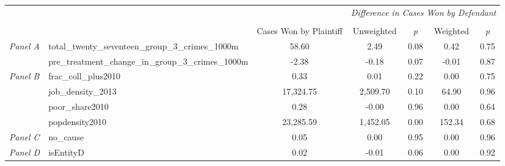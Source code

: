 \begin{tabular}{llccccc}
\toprule
 &  & \textit{} & \multicolumn{4}{c}{\textit{Difference in Cases Won by Defendant}} \\
\cline{4-7}
\\
 &  & Cases Won by Plaintiff & Unweighted & \emph{p} & Weighted & \emph{p} \\
\midrule
\multirow[c]{2}{3cm}{\textit{Panel A}} & total_twenty_seventeen_group_3_crimes_1000m & 58.60 & 2.49 & 0.08 & 0.42 & 0.75 \\
 & pre_treatment_change_in_group_3_crimes_1000m & -2.38 & -0.18 & 0.07 & -0.01 & 0.87 \\
\cline{1-7}
\multirow[c]{4}{3cm}{\textit{Panel B}} & frac_coll_plus2010 & 0.33 & 0.01 & 0.22 & 0.00 & 0.75 \\
 & job_density_2013 & 17,324.75 & 2,509.70 & 0.10 & 64.90 & 0.96 \\
 & poor_share2010 & 0.28 & -0.00 & 0.96 & 0.00 & 0.64 \\
 & popdensity2010 & 23,285.59 & 1,452.05 & 0.00 & 152.34 & 0.68 \\
\cline{1-7}
\textit{Panel C} & no_cause & 0.05 & 0.00 & 0.95 & 0.00 & 0.96 \\
\cline{1-7}
\textit{Panel D} & isEntityD & 0.02 & -0.01 & 0.06 & 0.00 & 0.92 \\
\cline{1-7}
\bottomrule
\end{tabular}
